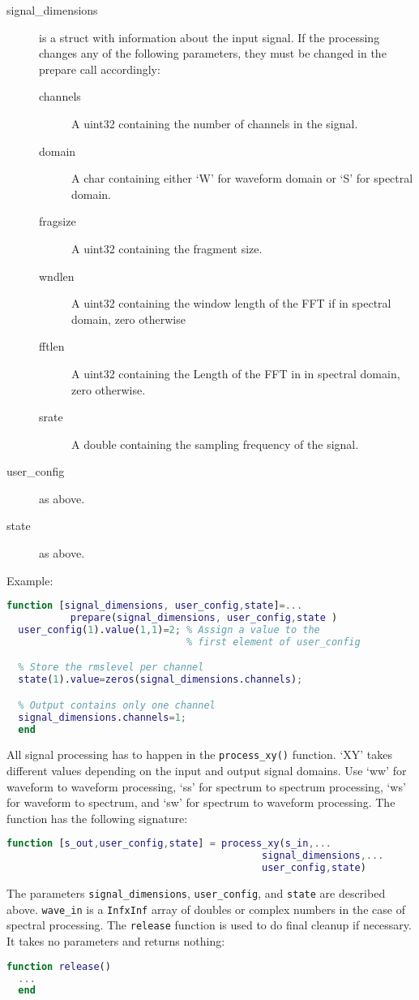 \documentclass[11pt,a4paper,twoside]{article}
\newcommand{\+}{\discretionary{\mbox{\scriptsize$\hookleftarrow$}}{}{}}
\begin{document}
  \begin{description}
  \item[signal\_dimensions] is a struct with information about the input signal.
    If the processing changes any of the following parameters,
    they must be changed in the prepare call accordingly:
    \begin{description}
    \item[channels] A uint32 containing the number of channels in the signal.
    \item[domain] A char containing either `W' for waveform domain or `S' for spectral domain. 
    \item[fragsize] A uint32 containing the fragment size.
    \item[wndlen] A uint32 containing the window length of the FFT if in spectral domain, zero otherwise
    \item[fftlen] A uint32 containing the Length of the FFT in in spectral domain, zero otherwise.
    \item[srate] A double containing the sampling frequency of the signal.
    \end{description}
  \item[user\_config] as above.
  \item[state] as above.
  \end{description}
  Example:
\begin{lstlisting}[language=Matlab]
  function [signal_dimensions, user_config,state]=...
           prepare(signal_dimensions, user_config,state )
  user_config(1).value(1,1)=2; % Assign a value to the
                               % first element of user_config

  % Store the rmslevel per channel 
  state(1).value=zeros(signal_dimensions.channels); 

  % Output contains only one channel
  signal_dimensions.channels=1; 
  end
\end{lstlisting}
All signal processing has to happen in the \texttt{process\_xy()} function. `XY' takes different values
depending on the input and output signal domains. Use `ww' for waveform to
waveform processing,  `ss' for spectrum to spectrum processing,  `ws' for waveform
to spectrum, and `sw' for spectrum to waveform processing. The function has the following signature:
\begin{lstlisting}[language=Matlab]
  function [s_out,user_config,state] = process_xy(s_in,...
                                            signal_dimensions,...
                                            user_config,state)
\end{lstlisting}
The parameters \texttt{signal\_dimensions}, \texttt{user\_config}, and
\texttt{state} are described above.
\texttt{wave\_in} is a \texttt{InfxInf} array of doubles or complex numbers in
the case of spectral processing.
The \texttt{release} function is used to do final cleanup if necessary.
It takes no parameters and returns nothing:
\begin{lstlisting}[language=Matlab]
  function release()
  ...
  end
\end{lstlisting}
\end{document}
